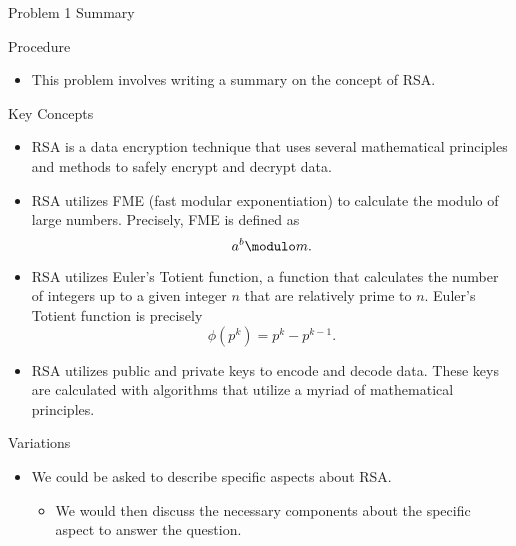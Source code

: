 \begin{summary}{Problem 1 Summary}
    \begin{statement}{Procedure}
        \begin{itemize}
            \item This problem involves writing a summary on the concept of RSA.
        \end{itemize}
    \end{statement}
    \begin{statement}{Key Concepts}
        \begin{itemize}
            \item RSA is a data encryption technique that uses several mathematical principles and methods to safely encrypt and decrypt data.
            \item RSA utilizes FME (fast modular exponentiation) to calculate the modulo of large numbers. Precisely, FME is defined as
            \begin{equation*}
                a^{b} \modulo m.
            \end{equation*}
            \item RSA utilizes Euler's Totient function, a function that calculates the number of integers up to a given integer $n$ that are relatively prime to $n$. Euler's Totient function is precisely
            \begin{equation*}
                \phi(p^{k}) = p^{k} - p^{k - 1}.
            \end{equation*}
            \item RSA utilizes public and private keys to encode and decode data. These keys are calculated with algorithms that utilize a myriad of mathematical principles.
        \end{itemize}
    \end{statement}
    \begin{statement}{Variations}
        \begin{itemize}
            \item We could be asked to describe specific aspects about RSA.
            \begin{itemize}
                \item We would then discuss the necessary components about the specific aspect to answer the question.
            \end{itemize}
        \end{itemize}
    \end{statement}
\end{summary}

